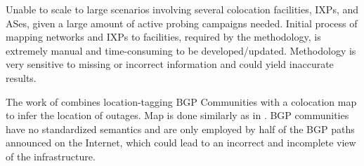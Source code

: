 	Unable to scale to large scenarios involving several colocation facilities, IXPs, and ASes, given a large amount of active probing campaigns needed. Initial process of mapping networks and IXPs to facilities, required by the methodology, is extremely manual and time-consuming to be developed/updated. Methodology is very sensitive to missing or incorrect information and could yield inaccurate results. 

	The work of \cite{Giotsas:2017:DPI:3098822.3098855} combines location-tagging BGP Communities with a colocation map to infer the location of outages. Map is done similarly as in \cite{Giotsas:2015:MPI:2716281.2836122}. BGP communities have no standardized semantics and are only employed by half of the BGP paths announced on the Internet, which could lead to an incorrect and incomplete view of the infrastructure.
